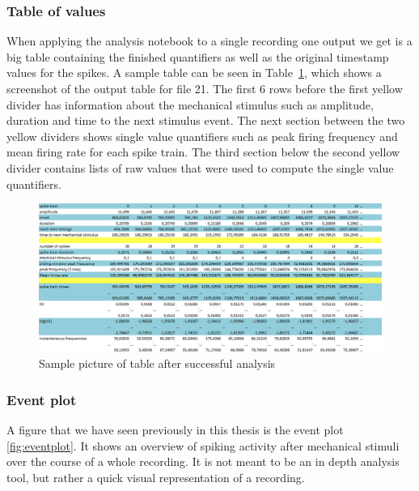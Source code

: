 \subsubsection{Table of values}
When applying the analysis notebook to a single recording one output we get is a big table containing the finished quantifiers as well as the original timestamp values for the spikes. A sample table can be seen in Table~\ref{fig:table_sc}, which shows a screenshot of the output table for file 21. The first 6 rows before the first yellow divider has information about the mechanical stimulus such as amplitude, duration and time to the next stimulus event. The next section between the two yellow dividers shows single value quantifiers such as peak firing frequency and mean firing rate for each spike train. The third section below the second yellow divider contains lists of raw values that were used to compute the single value quantifiers.\\
\begin{figure}
	\includegraphics[width = \textwidth]{src/pic/sc_table}
	\caption{Sample picture of table after successful analysis }
	\label{fig:table_sc}
\end{figure}

\subsubsection{Event plot}
A figure that we have seen previously in this thesis is the event plot \ref{fig:eventplot}. It shows an overview of spiking activity after mechanical stimuli over the course of a whole recording. It is not meant to be an in depth analysis tool, but rather a quick visual representation of a recording.

